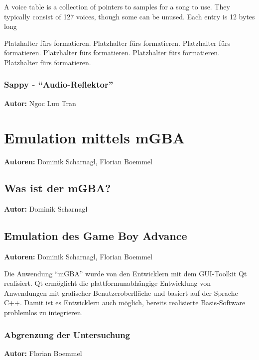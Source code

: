 \documentclass[11pt,a4paper]{scrartcl}
\newcommand{\AutorDominik} {
    \vspace{-4mm}
    \large \textbf{Autor:} Dominik Scharnagl \normalsize
    \vspace{2mm}
}
\newcommand{\AutorDominikFlorian} {
    \vspace{-4mm}
    \large \textbf{Autoren:} Dominik Scharnagl, Florian Boemmel \normalsize
    \vspace{2mm}
}
\newcommand{\AutorFlorian} {
    \vspace{-4mm}
    \large \textbf{Autor:} Florian Boemmel \normalsize
    \vspace{2mm}
}
\newcommand{\AutorNgoc} {
    \vspace{-4mm}
    \large \textbf{Autor:} Ngoc Luu Tran \normalsize
    \vspace{2mm}
}
\begin{document}
A voice table is a collection of pointers to samples for a song to use. They typically consist of 127 voices, though some can be unused. Each entry is 12 bytes long

Platzhalter f\"{u}rs formatieren. Platzhalter f\"{u}rs formatieren. Platzhalter f\"{u}rs formatieren. Platzhalter f\"{u}rs formatieren. Platzhalter f\"{u}rs formatieren. Platzhalter f\"{u}rs formatieren.




\subsubsection{Sappy - "`Audio-Reflektor"'}
\AutorNgoc

\newpage

\newpage


\section{Emulation mittels mGBA} \label{EmulationMittelsMGBA}
\AutorDominikFlorian


\subsection{Was ist der mGBA?}
\AutorDominik


\subsection{Emulation des Game Boy Advance} \label{EmulationGameBoyAdvance}
\AutorDominikFlorian

Die Anwendung \enquote{mGBA} wurde von den Entwicklern mit dem GUI-Toolkit Qt realisiert. Qt erm\"oglicht die plattformunabh\"angige Entwicklung von Anwendungen mit grafischer Benutzeroberfl\"ache und basiert auf der Sprache C++. Damit ist es Entwicklern auch m\"oglich, bereits realisierte Basis-Software problemlos zu integrieren.


\subsubsection{Abgrenzung der Untersuchung}
\AutorFlorian
\end{document}
